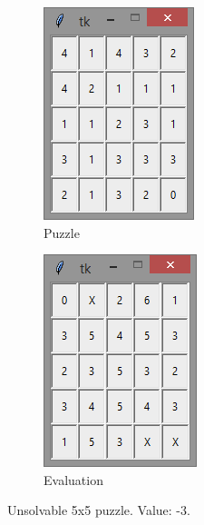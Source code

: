 \documentclass[12pt]{article}
\begin{document}
\begin{figure}[H]
	\begin{subfigure}{.5\textwidth}
		\centering
     		\includegraphics[width = .6\linewidth]{5x5_puzzle_-3}
     		\caption{Puzzle}
     		\label{fig3:sfig1}
	\end{subfigure}
	\begin{subfigure}{.5\textwidth}
		\centering
		\includegraphics[width = .6\linewidth]{5x5_eval_-3}
		\caption{Evaluation}
		\label{fig3:sfig2}
	\end{subfigure}
\caption{Unsolvable 5x5 puzzle. Value: -3.}
\label{fig:5x5bad}
\end{figure}
\end{document}
